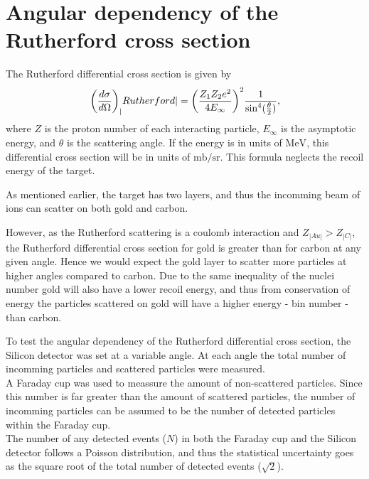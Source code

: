 \section{Angular dependency of the Rutherford cross section}
The Rutherford differential cross section \parencite[p. 16]{noteBB} is given by
\begin{align}\label{eq:cross}
    {\left( \diff[d]{\sigma}{\Omega} \right)}_|Rutherford| =
    {\left(\frac{Z_1Z_2 e^2}{4E_{\infty}} \right)}^2
    \frac{1}{{{\sin}^4(\frac{\theta}{2})}},
\end{align}
where $Z$ is the proton number of each interacting particle, $E_{\infty}$ is
the asymptotic energy, and $\theta$ is the scattering angle. If the energy is
in units of $\si{\mega\electronvolt}$, this differential cross section will be in units
of $\si{\milli\barn\per\steradian}$.
This formula neglects the recoil energy of the target.

As mentioned earlier, the target has two layers, and thus the incomming beam of
ions can scatter on both gold and carbon. 

However, as the Rutherford scattering is a coulomb interaction and $Z_|Au| >
Z_|C|$, the Rutherford differential cross section for gold is greater than for carbon at any given angle. Hence we would expect the gold layer to scatter more particles at higher angles compared to carbon. Due to the same inequality of the nuclei number gold will also have a lower recoil energy, and thus from conservation of energy the particles scattered on gold will have a higher energy - bin number - than carbon.

To test the angular dependency of the Rutherford differential cross section,
the Silicon detector was set at a variable angle. At each angle the total
number of incomming particles and scattered particles were measured.\\

A Faraday cup was used to meassure the amount of non-scattered particles. 
Since this number is far greater than the amount of scattered particles, the
number of incomming particles can be assumed to be the number of detected
particles within the Faraday cup.\\

The number of any detected events ($N$) in both the Faraday cup and the Silicon
detector follows a Poisson distribution, and thus the statistical uncertainty
goes as the square root of the total number of detected events ($\sqrt{2}$).\\

